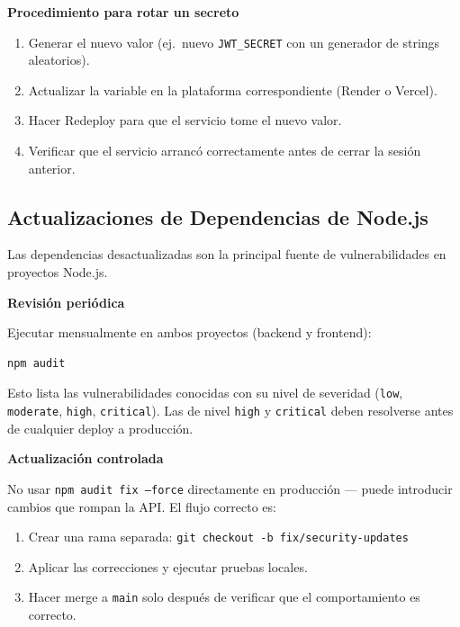 \documentclass[12pt, a4paper]{article}
\begin{document}
\bigskip
\textbf{Procedimiento para rotar un secreto}

\begin{enumerate}
    \item Generar el nuevo valor (ej.\ nuevo \texttt{JWT\_SECRET} con un generador de strings aleatorios).
    \item Actualizar la variable en la plataforma correspondiente (Render o Vercel).
    \item Hacer Redeploy para que el servicio tome el nuevo valor.
    \item Verificar que el servicio arrancó correctamente antes de cerrar la sesión anterior.
\end{enumerate}

\subsection{Actualizaciones de Dependencias de Node.js}

Las dependencias desactualizadas son la principal fuente de vulnerabilidades en proyectos Node.js.

\bigskip
\textbf{Revisión periódica}

Ejecutar mensualmente en ambos proyectos (backend y frontend):

\begin{lstlisting}
npm audit
\end{lstlisting}

Esto lista las vulnerabilidades conocidas con su nivel de severidad
(\texttt{low}, \texttt{moderate}, \texttt{high}, \texttt{critical}).
Las de nivel \texttt{high} y \texttt{critical} deben resolverse antes de cualquier deploy a producción.

\bigskip
\textbf{Actualización controlada}

No usar \texttt{npm audit fix --force} directamente en producción --- puede introducir cambios
que rompan la API. El flujo correcto es:

\begin{enumerate}
    \item Crear una rama separada: \texttt{git checkout -b fix/security-updates}
    \item Aplicar las correcciones y ejecutar pruebas locales.
    \item Hacer merge a \texttt{main} solo después de verificar que el comportamiento es correcto.
\end{enumerate}
\end{document}
